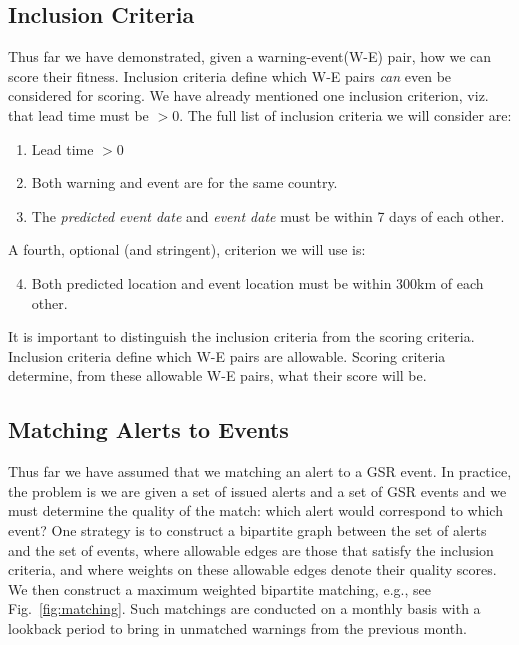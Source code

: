 \subsection{Inclusion Criteria}
Thus far we have demonstrated, given a warning-event(W-E) pair, how we can
score their fitness. Inclusion criteria define which W-E pairs {\it can}
even be considered for scoring. We have already mentioned one inclusion
criterion, viz. that lead time must be $> 0$. The full list of inclusion
criteria we will consider are:
\begin{enumerate}
\item Lead time $> 0$
\item Both warning and event are for the same country.
\item The {\it predicted event date} and {\it event date} must be
within 7 days of each other.
\end{enumerate}
A fourth, optional (and stringent), criterion we will use is:
\begin{enumerate}
  \setcounter{enumi}{3}
  \item Both predicted location and event location must be within 300km of
each other.
\end{enumerate}
It is important to distinguish the inclusion criteria from the scoring
criteria. Inclusion criteria define which W-E pairs are allowable.
Scoring criteria determine, from these allowable W-E pairs, what their
score will be.

\subsection{Matching Alerts to Events}
Thus far we have assumed that we matching an alert to a GSR event. In
practice, the problem is we are given a set of issued alerts  and a set
of GSR events and we must determine the quality of the match: which
alert would correspond to which event? One strategy is to construct
a bipartite graph between the set of alerts and the set of events,
where allowable edges are those that satisfy the inclusion criteria, and
where weights on these allowable edges denote their quality scores.
We then construct
a maximum weighted bipartite matching, e.g., see
Fig.~\ref{fig:matching}. Such matchings are conducted on a monthly basis
with a lookback period to bring in unmatched warnings from the previous month.

